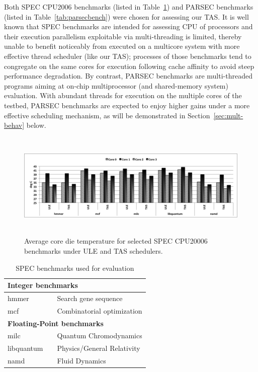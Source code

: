 \documentclass[times, 10pt,twocolumn]{IEEEtran}
\begin{document}
Both SPEC CPU2006 benchmarks (listed in Table~\ref{tab:benchmarks}) and
PARSEC benchmarks (listed in Table~\ref{tab:parsecbench}) were chosen
for assessing our TAS.  It is well known that SPEC benchmarks are
intended for assessing CPU of processors and their execution parallelism
exploitable via multi-threading is limited, thereby unable to benefit
noticeably from executed on a multicore system with more effective
thread scheduler (like our TAS); processes of those benchmarks
tend to congregate on the same cores for execution following cache affinity
to avoid steep performance degradation.
By contrast, PARSEC benchmarks are multi-threaded
programs aiming at on-chip multiprocessor (and shared-memory system)
evaluation.  With abundant threads for execution on the multiple cores
of the testbed, PARSEC benchmarks are expected to enjoy higher gains under
a more effective scheduling mechanism, as will be demonstrated in
Section~\ref{sec:mult-behav} below.

\begin{figure}[!tbhp] 
\centering
\includegraphics[width=1.0\linewidth,height=2in]{graphics/speccputemp}
\caption{Average core die temperature for selected SPEC CPU20006
benchmarks under ULE and TAS schedulers.}
\label{fig:ubenchmarks}
\end{figure}

\begin{small}
\begin{table}[tbph]
\caption{SPEC benchmarks used for evaluation}
\label{tab:benchmarks} 
\centering
\begin{tabular}{l c p{5cm}} 
\hline 
\hline
\multicolumn{3}{l}{\textbf{Integer benchmarks}}\\
\hline 
hmmer &  & Search gene sequence \\
mcf &  & Combinatorial optimization \\
\hline 
\hline
\multicolumn{3}{l}{\textbf{Floating-Point benchmarks}}\\ 
\hline 
milc &  & Quantum Chromodynamics \\
libquantum &  & Physics/General Relativity \\
namd &  & Fluid Dynamics \\
\hline
\end{tabular} %
\end{table}
\end{small}
\end{document}
